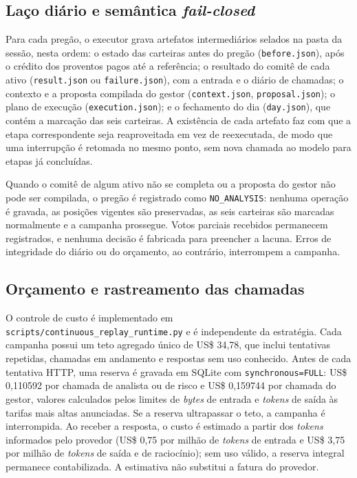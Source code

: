 \documentclass{eic-bcc-tcc}
\begin{document}
\subsection{Laço diário e semântica \textit{fail-closed}}

Para cada pregão, o executor grava artefatos intermediários selados na pasta da sessão, nesta ordem: o estado das carteiras antes do pregão (\texttt{before.json}), após o crédito dos proventos pagos até a referência; o resultado do comitê de cada ativo (\texttt{result.json} ou \texttt{failure.json}), com a entrada e o diário de chamadas; o contexto e a proposta compilada do gestor (\texttt{context.json}, \texttt{proposal.json}); o plano de execução (\texttt{execution.json}); e o fechamento do dia (\texttt{day.json}), que contém a marcação das seis carteiras. A existência de cada artefato faz com que a etapa correspondente seja reaproveitada em vez de reexecutada, de modo que uma interrupção é retomada no mesmo ponto, sem nova chamada ao modelo para etapas já concluídas.

Quando o comitê de algum ativo não se completa ou a proposta do gestor não pode ser compilada, o pregão é registrado como \texttt{NO\_ANALYSIS}: nenhuma operação é gravada, as posições vigentes são preservadas, as seis carteiras são marcadas normalmente e a campanha prossegue. Votos parciais recebidos permanecem registrados, e nenhuma decisão é fabricada para preencher a lacuna. Erros de integridade do diário ou do orçamento, ao contrário, interrompem a campanha.

\subsection{Orçamento e rastreamento das chamadas}

O controle de custo é implementado em \texttt{scripts/continuous\_replay\_runtime.py} e é independente da estratégia. Cada campanha possui um teto agregado único de US\$ 34,78, que inclui tentativas repetidas, chamadas em andamento e respostas sem uso conhecido. Antes de cada tentativa HTTP, uma reserva é gravada em SQLite com \texttt{synchronous=FULL}: US\$ 0,110592 por chamada de analista ou de risco e US\$ 0,159744 por chamada do gestor, valores calculados pelos limites de \textit{bytes} de entrada e \textit{tokens} de saída às tarifas mais altas anunciadas. Se a reserva ultrapassar o teto, a campanha é interrompida. Ao receber a resposta, o custo é estimado a partir dos \textit{tokens} informados pelo provedor (US\$ 0,75 por milhão de \textit{tokens} de entrada e US\$ 3,75 por milhão de \textit{tokens} de saída e de raciocínio); sem uso válido, a reserva integral permanece contabilizada. A estimativa não substitui a fatura do provedor.
\end{document}
